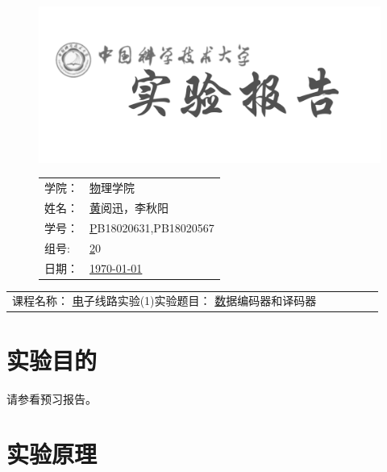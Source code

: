 \documentclass[a4paper,11pt,UTF8]{ctexart}
\newcommand{\major}{物理学院}
\newcommand{\name}{黄阅迅，李秋阳}
\newcommand{\stuid}{PB18020631,PB18020567}
\newcommand{\group}{20}
\newcommand{\newdate}{\today}
\newcommand{\course}{电子线路实验(1)}
\newcommand{\newtitle}{数据编码器和译码器}
\begin{document}
\thispagestyle{empty}
\begin{figure}[h]
  \begin{minipage}{0.6\linewidth}
    \centerline{\includegraphics[width=\linewidth]{logo.png}}
  \end{minipage}
  \hfill
  \begin{minipage}{.4\linewidth}
    \raggedleft
    \begin{tabular*}{.8\linewidth}{ll}
      学院： & \underline\major   \\
      姓名： & \underline\name    \\
      学号： & \underline\stuid   \\
      组号:  & \underline\group   \\
      日期： & \underline\newdate \\
    \end{tabular*}
  \end{minipage}
\end{figure}

\begin{table}[!htbp]
  \centering
  \begin{tabular*}{\linewidth}{llllll}
    课程名称：  \underline\course   \qquad\qquad 实验题目：  \underline\newtitle  
  \end{tabular*}
\end{table}


\section{实验目的}

请参看预习报告。

\section{实验原理}
\end{document}
